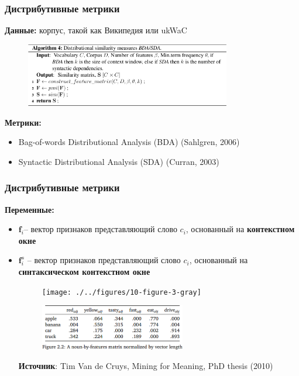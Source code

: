 \begin{frame}
\frametitle{Дистрибутивные метрики}

\textbf{Данные:} корпус, такой как Википедия или ukWaC

\begin{figure}
\centering
\includegraphics[width=0.8\textwidth]{./figures/dist-sem-algo}
\end{figure}

\textbf{Метрики:}
\begin{itemize}
    \item Bag-of-words Distributional Analysis (BDA) (Sahlgren, 2006)
    \item Syntactic Distributional Analysis (SDA) (Curran, 2003)
\end{itemize}
    
\end{frame} 
    
    
    
\begin{frame}
\frametitle{Дистрибутивные метрики}

\textbf{Переменные:} 
\begin{itemize}

\item $\textbf{f}_i$-- вектор признаков представляющий слово $c_i$, основанный на \textbf{контекстном окне}

\item $ \mathbf{f}^s_i$ -- вектор признаков представляющий слово $c_i$, основанный на \textbf{синтаксическом контекстном окне}
\begin{figure}
\texttt{[image: ./../figures/10-figure-3-gray]}
\end{figure}

\begin{figure}
\includegraphics[width=0.6\textwidth]{./figures/sda-table}
\end{figure}

\tiny{\textbf{Источник}: Tim Van de Cruys, Mining for Meaning, PhD thesis (2010)}

   
\end{itemize}
    
    
\end{frame}
    




